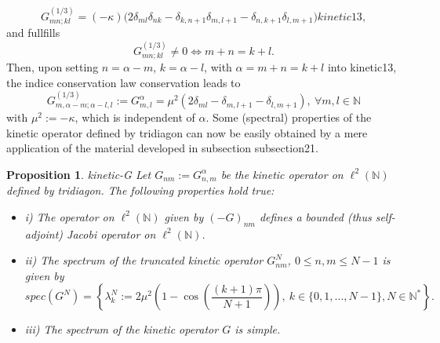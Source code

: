 \documentclass[10pt]{book}
\theoremstyle{break}
\newtheorem{proposition}{Proposition}
\begin{document}
\begin{equation}
 G^{(1/3)}_{mn;kl}=(-\kappa)\big(2\delta_{ml}\delta_{nk} - \delta_{k,n+1}\delta_{m,l+1}-\delta_{n,k+1}\delta_{l,m+1}\big){kinetic13},
\end{equation}
and fullfills
\begin{equation}
G^{(1/3)}_{mn;kl}\ne0\iff m+n=k+l.
\end{equation}
Then, upon setting $n=\alpha-m$, $k=\alpha-l$, with $\alpha=m+n=k+l$ into {kinetic13}, the indice conservation law {conservation} leads to
\begin{equation}
G^{(1/3)}_{m,\alpha-m;\alpha-l,l}:=G^{\alpha}_{m,l}=\mu^2(2\delta_{ml}- \delta_{m,l+1}-\delta_{l,m+1}),\ \forall m,l\in\mathbb{N}
\end{equation}
with $\mu^2:=-\kappa$, which is independent of $\alpha$. Some (spectral) properties of the kinetic operator defined by {tridiagon} can now be easily obtained by a mere application of the material developed in subsection {subsection21}.
\begin{proposition}{kinetic-G}
Let $G_{nm}:=G^{\alpha}_{n,m}$ be the kinetic operator on $\ell^2(\mathbb{N})$ defined by {tridiagon}. The following properties hold true:
\begin{itemize}
\vspace*{-4pt}
\setlength{\itemsep}{-1pt}
\item i) The operator on $\ell^2(\mathbb{N})$ given by $(-G)_{nm}$ defines a bounded (thus self-adjoint) Jacobi operator on $\ell^2(\mathbb{N})$.
\item ii) The spectrum of the truncated kinetic operator $G^N_{nm}$, $0\le n,m\le N-1$ is given by 
\begin{equation}
spec(G^N)=\left\{\lambda^N_k:=2\mu^2\left(1-\cos(\frac{(k+1)\pi}{N+1})\right), \ k\in\{0,1,...,N-1\}, N\in\mathbb{N}^*\right\}.
\end{equation}
\item iii) The spectrum of the kinetic operator $G$ is simple.
\end{itemize}
\end{proposition}
\end{document}
